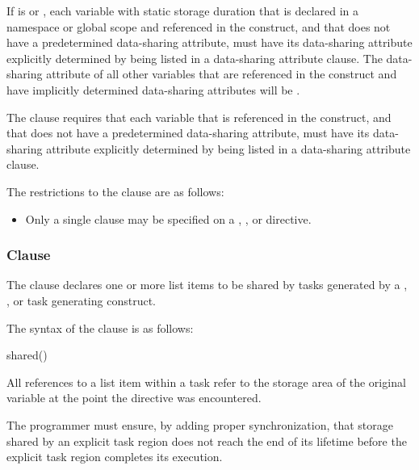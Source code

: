 \begin{ccppspecific}
If  is  or , each
variable with static storage duration that is declared in a namespace or global
scope and referenced in the construct, and that does not have a predetermined
data-sharing attribute, must have its data-sharing attribute explicitly
determined by being listed in a data-sharing attribute clause. The data-sharing
attribute of all other variables that are referenced in the construct and have
implicitly determined data-sharing attributes will be
.
\end{ccppspecific}

The  clause requires that each variable that is referenced 
in the construct, and that does not have a predetermined data-sharing attribute, 
must have its data-sharing attribute explicitly determined by being listed in a 
data-sharing attribute clause.


\restrictions
The restrictions to the  clause are as follows:

\begin{itemize}
\item Only a single  clause may be specified on a
      , ,  or  directive.
\end{itemize}



\subsubsection{ Clause}
\label{subsubsec:shared clause}
\summary
The  clause declares one or more list items to be shared by 
tasks generated by a , , or task generating construct.

\syntax
The syntax of the  clause is as follows:

\begin{ompSyntax}
shared()
\end{ompSyntax}

\descr
All references to a list item within a task refer to the storage area of the 
original variable at the point the directive was encountered.

The programmer must ensure, by adding proper synchronization, that storage 
shared by an explicit task region does not reach the end of its lifetime before
the explicit task region completes its execution.


